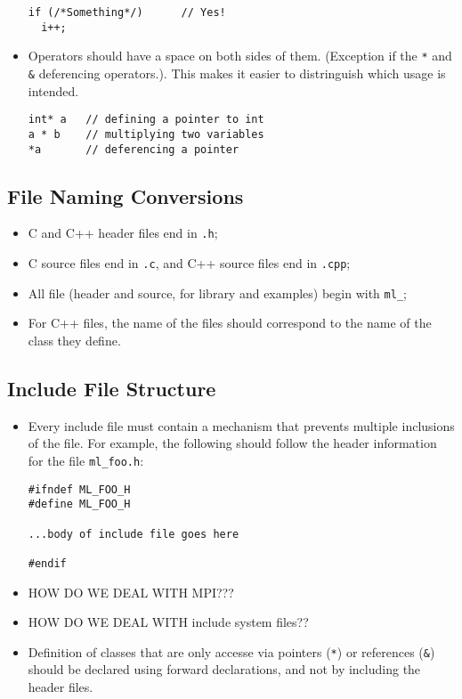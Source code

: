 \documentclass[10pt,letter,relax]{SANDreport}
\begin{document}
\begin{itemize}
\begin{verbatim}
if (/*Something*/)      // Yes!
  i++;
\end{verbatim}
\item Operators should have a space on both sides of them. 
(Exception if the \verb!*! and \verb!&! deferencing operators.). This makes it
easier to distringuish which usage is intended.
\begin{verbatim}
int* a   // defining a pointer to int
a * b    // multiplying two variables
*a       // deferencing a pointer
\end{verbatim}
\end{itemize}

\subsection{File Naming Conversions}

\begin{itemize}
\item C and C++ header files end in \verb!.h!;
\item C source files end in \verb!.c!, and C++ source files end in
\verb!.cpp!;
\item All file (header and source, for library and examples) begin with \verb!ml_!;
\item For C++ files, the name of the files should correspond to the name of
the class they define.
\end{itemize}

\subsection{Include File Structure}

\begin{itemize}
\item Every include file must contain a mechanism that prevents multiple
inclusions of the file. For example, the following should follow the header
information for the file \verb!ml_foo.h!:
\begin{verbatim}
#ifndef ML_FOO_H
#define ML_FOO_H

...body of include file goes here

#endif
\end{verbatim}
\item HOW DO WE DEAL WITH MPI???
\item HOW DO WE DEAL WITH include system files??
\item Definition of classes that are only accesse via pointers (\verb!*!) or
references (\verb!&!) should be declared using forward declarations, and not by
including the header files.
\end{itemize}
\end{document}
